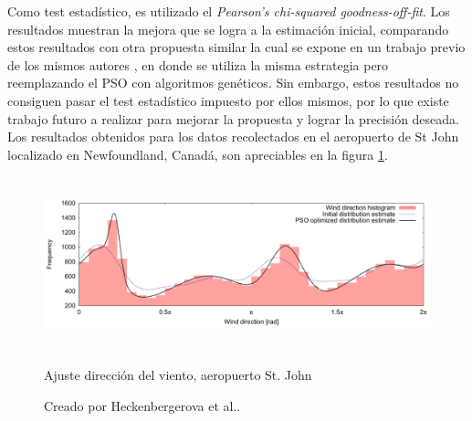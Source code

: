 Como test estadístico, es utilizado el \emph{Pearson's chi-squared goodness-off-fit}. Los resultados muestran la mejora que se logra a la estimación inicial, comparando estos resultados con otra propuesta similar la cual se expone en un trabajo previo de los mismos autores \cite{Heckenbergerova13}, en donde se utiliza la misma estrategia pero reemplazando el PSO con algoritmos genéticos. Sin embargo, estos resultados no consiguen pasar el test estadístico impuesto por ellos mismos, por lo que existe trabajo futuro  a realizar para mejorar la propuesta y lograr la precisión deseada.\\
Los resultados obtenidos para los datos recolectados en el aeropuerto de St John localizado en Newfoundland, Canadá, son apreciables en la figura \ref{fig:dir_pso}.
\begin{figure}[h!]
    \centering    
    \includegraphics[height=50mm]{figures/dir_pso.png} 
    \caption{Ajuste dirección del viento, aeropuerto St. John}
    \vspace{-.25cm} 
    \caption*{Creado por Heckenbergerova et al.\cite{Heckenbergerova15}.}
    \label{fig:dir_pso}
\end{figure}

